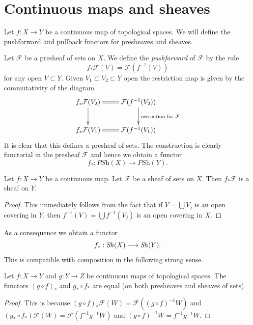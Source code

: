 \section{Continuous maps and sheaves}
\label{section-presheaves-functorial}

\noindent
Let $f : X \to Y$ be a continuous map of topological spaces.
We will define the pushforward and pullback functors for
presheaves and sheaves.

\medskip\noindent
Let $\mathcal{F}$ be a presheaf of sets on $X$. We define the
{\it pushforward} of $\mathcal{F}$ by the rule
$$
f_*\mathcal{F}(V) = \mathcal{F}(f^{-1}(V))
$$
for any open $V \subset Y$.
Given $V_1 \subset V_2 \subset Y$ open the restriction map
is given by the commutativity of the diagram
$$
\xymatrix{
f_*\mathcal{F}(V_2) \ar[d] \ar@{=}[r] &
\mathcal{F}(f^{-1}(V_2)) \ar[d]^{\text{restriction for }\mathcal{F}} \\
f_*\mathcal{F}(V_1) \ar@{=}[r] &
\mathcal{F}(f^{-1}(V_1))
}
$$
It is clear that this defines a presheaf of sets. The construction
is clearly functorial in the presheaf $\mathcal{F}$ and hence
we obtain a functor
$$
f_* : \textit{PSh}(X) \longrightarrow \textit{PSh}(Y).
$$

\begin{lemma}
\label{lemma-pushforward-sheaf}
Let $f : X \to Y$ be a continuous map.
Let $\mathcal{F}$ be a sheaf of sets on $X$.
Then $f_*\mathcal{F}$ is a sheaf on $Y$.
\end{lemma}

\begin{proof}
This immediately follows from the fact that
if $V = \bigcup V_j$ is an open covering in $Y$,
then $f^{-1}(V) = \bigcup f^{-1}(V_j)$ is an open covering in $X$.
\end{proof}

\noindent
As a consequence we obtain a functor
$$
f_* : \mathop{\mathit{Sh}}\nolimits(X) \longrightarrow \mathop{\mathit{Sh}}\nolimits(Y).
$$
This is compatible with composition in the following
strong sense.

\begin{lemma}
\label{lemma-pushforward-composition}
Let $f : X \to Y$ and $g : Y \to Z$ be continuous maps
of topological spaces. The functors $(g \circ f)_*$
and $g_* \circ f_*$ are equal (on both presheaves
and sheaves of sets).
\end{lemma}

\begin{proof}
This is because $(g \circ f)_*\mathcal{F}(W) =
\mathcal{F}((g \circ f)^{-1}W)$ and
$(g_* \circ f_*)\mathcal{F}(W) = \mathcal{F}(f^{-1} g^{-1} W)$
and $(g \circ f)^{-1}W = f^{-1} g^{-1} W$.
\end{proof}

